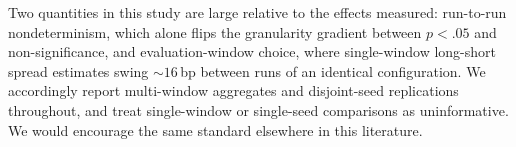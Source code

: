 Two quantities in this study are large relative to the effects measured:
run-to-run nondeterminism, which alone flips the granularity gradient
between $p<.05$ and non-significance, and evaluation-window choice, where
single-window long-short spread estimates swing ${\sim}16$\,bp between runs
of an identical configuration. We accordingly report multi-window aggregates
and disjoint-seed replications throughout, and treat single-window or
single-seed comparisons as uninformative. We would encourage the same
standard elsewhere in this literature.
